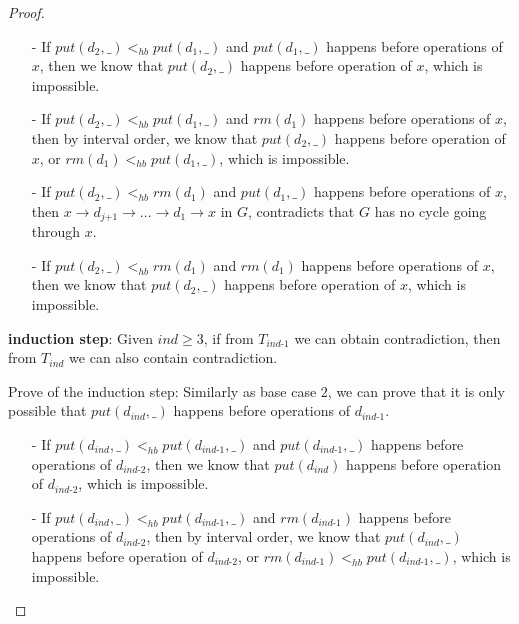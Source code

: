 \begin {proof}
\begin{itemize}
    \begin{itemize}
    \setlength{\itemsep}{0.5pt}
    \item[-] If $\textit{put}(d_2,\_) <_{hb} \textit{put}(d_1,\_)$ and $\textit{put}(d_1,\_)$ happens before operations of $x$, then we know that $\textit{put}(d_2,\_)$ happens before operation of $x$, which is impossible.

    \item[-] If $\textit{put}(d_2,\_) <_{hb} \textit{put}(d_1,\_)$ and $\textit{rm}(d_1)$ happens before operations of $x$, then by interval order, we know that $\textit{put}(d_2,\_)$ happens before operation of $x$, or $\textit{rm}(d_1) <_{hb} \textit{put}(d_1,\_)$, which is impossible.

    \item[-] If $\textit{put}(d_2,\_) <_{hb} \textit{rm}(d_1)$ and $\textit{put}(d_1,\_)$ happens before operations of $x$, then $x \rightarrow d_{\textit{j+1}} \rightarrow \ldots \rightarrow d_1 \rightarrow x$ in $G$, contradicts that $G$ has no cycle going through $x$.

    \item[-] If $\textit{put}(d_2,\_) <_{hb} \textit{rm}(d_1)$ and $\textit{rm}(d_1)$ happens before operations of $x$, then we know that $\textit{put}(d_2,\_)$ happens before operation of $x$, which is impossible.
    \end{itemize}

    {\bf induction step}: Given $\textit{ind} \geq 3$, if from $T_{\textit{ind-1}}$ we can obtain contradiction, then from $T_{\textit{ind}}$ we can also contain contradiction.


    Prove of the induction step: Similarly as base case $2$, we can prove that it is only possible that $\textit{put}(d_{\textit{ind}},\_)$ happens before operations of $d_{\textit{ind-1}}$.

    \begin{itemize}
    \setlength{\itemsep}{0.5pt}
    \item[-] If $\textit{put}(d_{\textit{ind}},\_) <_{hb} \textit{put}(d_{\textit{ind-1}},\_)$ and $\textit{put}(d_{\textit{ind-1}},\_)$ happens before operations of $d_{\textit{ind-2}}$, then we know that $\textit{put}(d_{\textit{ind}})$ happens before operation of $d_{\textit{ind-2}}$, which is impossible.

    \item[-] If $\textit{put}(d_{\textit{ind}},\_) <_{hb} \textit{put}(d_{\textit{ind-1}},\_)$ and $\textit{rm}(d_{\textit{ind-1}})$ happens before operations of $d_{\textit{ind-2}}$, then by interval order, we know that $\textit{put}(d_{\textit{ind}},\_)$ happens before operation of $d_{\textit{ind-2}}$, or $\textit{rm}(d_{\textit{ind-1}}) <_{hb} \textit{put}(d_{\textit{ind-1}},\_)$, which is impossible.


\end{itemize}
\end{itemize}
\end{proof}
